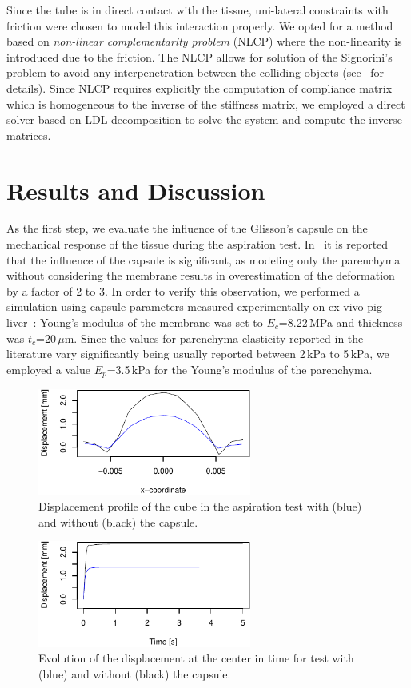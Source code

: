 \documentclass{acm_proc_article-sp}
\begin{document}
Since the tube is in direct contact with the tissue, uni-lateral constraints with friction were chosen 
to model this interaction properly. We opted for a method based on \emph{non-linear complementarity problem}  (NLCP)
where the non-linearity is introduced due to the friction. The NLCP
allows for solution of the Signorini's problem to avoid any interpenetration between the colliding 
objects (see~\cite{Duriez2006b} for details). Since NLCP requires explicitly the computation of compliance matrix which 
is homogeneous to the inverse of the stiffness matrix, we employed a direct solver based on LDL decomposition to 
solve the system and compute the inverse matrices. 


\section{Results and Discussion} %
As the first step, we evaluate the influence of the Glisson's capsule on the mechanical response of the tissue during
the aspiration test. 
In~\cite{Hollenstein2006} it is reported that the influence of the capsule is significant, as modeling 
only the parenchyma without considering the membrane results in overestimation of the deformation by a factor of 2 to 3. 
In order to verify this observation, we performed a simulation using capsule parameters measured experimentally on 
ex-vivo pig liver~\cite{Umale2011}: Young's modulus of the membrane was set to $E_c$=8.22\,MPa and thickness was
$t_c$=20\,$\mu$m. 
Since the values for parenchyma elasticity reported in the literature vary significantly being usually reported between 2\,kPa to 5\,kPa, 
we employed a value $E_p$=3.5\,kPa for the Young's modulus of the parenchyma. 

\begin{figure}
  \centering
  \includegraphics[width=7cm]{aspiration.pdf}
  \caption{\label{fig-aspiration2} Displacement profile of the cube in the
  aspiration test with (blue) and without (black) the capsule.}
\end{figure}

\begin{figure}
  \centering
  \includegraphics[height=3.5cm]{displacement.pdf}
  \caption{\label{fig-aspiration3} Evolution of the displacement at the center
  in time for test with (blue) and without (black) the capsule.}
\end{figure}
\end{document}
